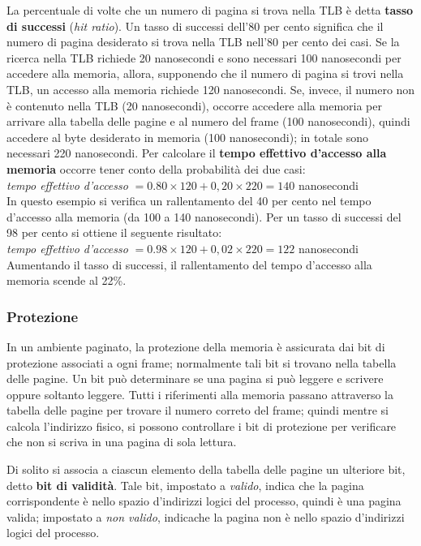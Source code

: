\documentclass[11pt,a4paper]{article}
\begin{document}
La percentuale di volte che un numero di pagina si trova nella TLB è detta \textbf{tasso di suc­cessi} (\emph{hit ratio}). Un tasso di successi dell'80 per cento significa che il numero di pagina desi­derato si trova nella TLB nell'80 per cento dei casi. Se la ricerca nella TLB richiede 20 nano­secondi e sono necessari 100 nanosecondi per accedere alla memoria, allora, supponendo
che il numero di pagina si trovi nella TLB, un accesso alla memoria richiede 120 nanosecon­di. Se, invece, il numero non è contenuto nella TLB (20 nanosecondi), occorre accedere alla
memoria per arrivare alla tabella delle pagine e al numero del frame (100 nanosecondi),
quindi accedere al byte desiderato in memoria (100 nanosecondi); in totale sono necessari
220 nanosecondi. Per calcolare il \textbf{tempo effettivo d'accesso alla memoria} occorre tener con­to della probabilità dei due casi:\medskip\\
\emph{tempo effettivo d'accesso} $= 0.80\times120+0,20\times220=140$ nanosecondi\medskip\\
In questo esempio si verifica un rallentamento del 40 per cento nel tempo d'accesso alla me­moria (da 100 a 140 nanosecondi).
Per un tasso di successi del 98 per cento si ottiene il seguente risultato:\medskip\\
\emph{tempo effettivo d'accesso} $= 0.98\times120+0,02\times220=122$ nanosecondi\medskip\\
Aumentando il tasso di successi, il rallentamento del tempo d'accesso alla memoria scende
al 22\%.

\subsubsection{Protezione}
In un ambiente paginato, la protezione della memoria è assicurata dai bit di protezione as­sociati a ogni frame; normalmente tali bit si trovano nella tabella delle pagine.
Un bit può determinare se una pagina si può leggere e scrivere oppure soltanto legge­re. Tutti i riferimenti alla memoria passano attraverso la tabella delle pagine per trovare il
numero correto del frame; quindi mentre si calcola l'indirizzo fisico, si possono controllare
i bit di protezione per verificare che non si scriva in una pagina di sola lettura.

Di solito si associa a ciascun elemento della tabella delle pagine un ulteriore bit, detto
\textbf{bit di validità}. Tale bit, impostato a \emph{valido}, indica che la pagina corrispondente è nello spa­zio d'indirizzi logici del processo, quindi è una pagina valida; impostato a \emph{non valido}, indicache la pagina non è nello spazio d'indirizzi logici del processo.
\end{document}
